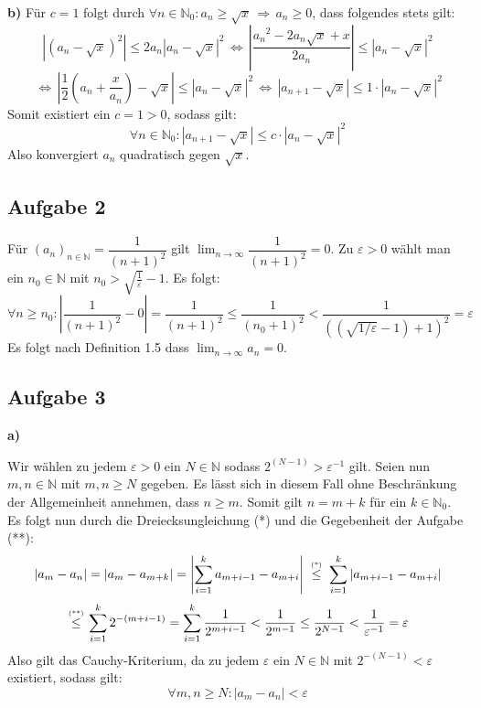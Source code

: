 \documentclass[a4paper,graphics,11pt]{article}
\newcommand{\aufgabe}[1]{\subsection*{Aufgabe #1}}
\newcommand{\up}[2]{\mathrel{\overset{\makebox[0pt]{\mbox{\normalfont\tiny #2}}}{#1}}}
\begin{document}
\textbf{b)} Für $c = 1$ folgt durch $\forall n \in \mathbb{N}_0 \colon a_n \geq \sqrt{x} \,\Longrightarrow\, a_n \geq 0$, dass folgendes stets gilt:
$$
    |(a_n - \sqrt{x})^2| \leq 2a_n|a_n - \sqrt{x}|^2 \,\Longleftrightarrow\,
    \left|\frac{{a_n}^2-2a_n\sqrt{x}+x}{2a_n}\right| \leq |a_n - \sqrt{x}|^2
$$$$
    \,\Longleftrightarrow\,\left|\frac{1}{2}\left(a_n+\frac{x}{a_n}\right) -\sqrt{x}\right|
    \leq |a_n-\sqrt{x}|^2
    \,\Longleftrightarrow\, |a_{n+1} -\sqrt{x}| \leq 1\cdot |a_n-\sqrt{x}|^2
$$
Somit existiert ein $c = 1 > 0$, sodass gilt:
$$
    \forall n \in \mathbb{N}_0 \colon |a_{n+1}-\sqrt{x}| \leq c\cdot |a_n-\sqrt{x}|^2
$$
Also konvergiert $a_n$ quadratisch gegen $\sqrt{x}$.
\newpage
\aufgabe{2}
Für $(a_n)_{n \in \mathbb{N}} = \dfrac{1}{(n+1)^2}$ gilt $\lim_{n \to \infty}\limits
\dfrac{1}{(n+1)^2} = 0$. Zu $\varepsilon > 0$ wählt man ein $n_0 \in \mathbb{N}$ mit
$\displaystyle n_0 > \sqrt{\frac{1}{\varepsilon}}-1$.
Es folgt:
$$
    \forall n \geq n_0 \colon \left|\frac{1}{(n+1)^2}-0\right| = \frac{1}{(n+1)^2}
    \leq \frac{1}{(n_0+1)^2} <
    \frac{1}{\left(\left(\sqrt{1/\varepsilon}-1\right)+1\right)^2} = \varepsilon
$$
Es folgt nach Definition 1.5 dass $\lim_{n \to \infty}\limits a_n = 0$.

\aufgabe{3}

\textbf{a)}

Wir wählen zu jedem $\varepsilon > 0$ ein $N \in \mathbb{N}$ sodass
$2^{(N-1)} > \varepsilon^{-1}$ gilt.
Seien nun $m,n \in \mathbb{N}$ mit $m, n\geq N$ gegeben. Es lässt sich in diesem Fall
ohne Beschränkung der Allgemeinheit annehmen, dass $n \geq m$. Somit gilt $n = m+k$ für
ein $k \in \mathbb{N}_0$. Es folgt nun durch die Dreiecksungleichung (*) und die Gegebenheit
der Aufgabe (**):
$$
    |a_m - a_n| = |a_m - a_{m+k}| = \left|\sum_{i=1}^{k} a_{m+i-1} - a_{m+i}\right|
    \up{\ \leq\ }{(*)} \sum_{i=1}^{k} |a_{m+i-1} - a_{m+i}|
$$$$
    \up{\ \leq\ }{(**)} \sum_{i=1}^{k} 2^{-(m+i-1)}
    = \sum_{i=1}^{k} \frac{1}{2^{m+i-1}} < \frac{1}{2^{m-1}}
    \leq \frac{1}{2^{N-1}} < \frac{1}{\varepsilon^{-1}} = \varepsilon
$$
Also gilt das Cauchy-Kriterium, da zu jedem $\varepsilon$ ein $N\in \mathbb{N}$ mit
$2^{-(N-1)} < \varepsilon$ existiert, sodass gilt:
$$
    \forall m,n \geq N \colon |a_m-a_n| < \varepsilon
$$
\end{document}
